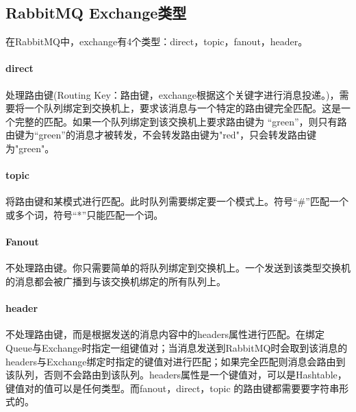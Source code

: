 \documentclass[../../../interview-questions.tex]{subfiles}
\begin{document}
\subsection{RabbitMQ Exchange类型}

在RabbitMQ中，exchange有4个类型：direct，topic，fanout，header。

\paragraph{direct}处理路由键(Routing Key：路由键，exchange根据这个关键字进行消息投递。)，需要将一个队列绑定到交换机上，要求该消息与一个特定的路由键完全匹配。这是一个完整的匹配。如果一个队列绑定到该交换机上要求路由键为 “green”，则只有路由键为“green”的消息才被转发，不会转发路由键为"red"，只会转发路由键为"green"。

\paragraph{topic}将路由键和某模式进行匹配。此时队列需要绑定要一个模式上。符号“\#”匹配一个或多个词，符号“*”只能匹配一个词。

\paragraph{Fanout}不处理路由键。你只需要简单的将队列绑定到交换机上。一个发送到该类型交换机的消息都会被广播到与该交换机绑定的所有队列上。

\paragraph{header}不处理路由键，而是根据发送的消息内容中的headers属性进行匹配。在绑定Queue与Exchange时指定一组键值对；当消息发送到RabbitMQ时会取到该消息的headers与Exchange绑定时指定的键值对进行匹配；如果完全匹配则消息会路由到该队列，否则不会路由到该队列。headers属性是一个键值对，可以是Hashtable，键值对的值可以是任何类型。而fanout，direct，topic 的路由键都需要要字符串形式的。
\end{document}
